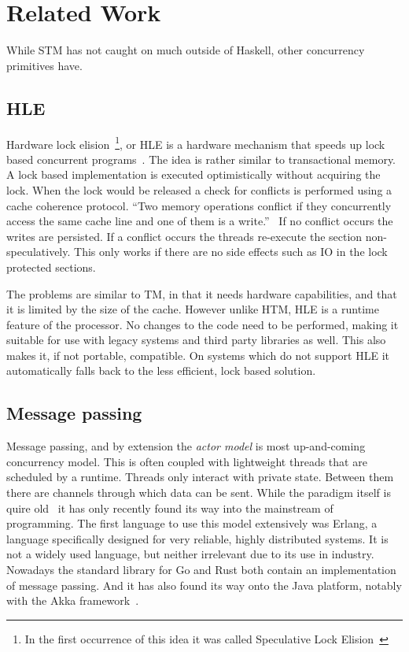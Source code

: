 \section{Related Work}

\label{sec:related-work}

While STM has not caught on much outside of Haskell, other concurrency
primitives have.

\subsection{HLE}

Hardware lock elision~\footnote{In the first occurrence of this idea it was
  called Speculative Lock Elision~\cite{sle}}, or HLE is a hardware mechanism
that speeds up lock based concurrent programs~\cite{sle,hle}. The idea is rather
similar to transactional memory. A lock based implementation is executed
optimistically without acquiring the lock. When the lock would be released a
check for conflicts is performed using a cache coherence protocol. ``Two memory
operations conflict if they concurrently access the same cache line and one of
them is a write.''~\cite{hle} If no conflict occurs the writes are persisted. If
a conflict occurs the threads re-execute the section non-speculatively. This
only works if there are no side effects such as IO in the lock protected
sections.

The problems are similar to TM, in that it needs hardware capabilities, and that
it is limited by the size of the cache. However unlike HTM, HLE is a runtime
feature of the processor. No changes to the code need to be performed, making it
suitable for use with legacy systems and third party libraries as well. This
also makes it, if not portable, compatible. On systems which do not support HLE
it automatically falls back to the less efficient, lock based solution.

\subsection{Message passing}

Message passing, and by extension the \emph{actor model} is most up-and-coming
concurrency model. This is often coupled with lightweight threads that are
scheduled by a runtime. Threads only interact with private state. Between them
there are channels through which data can be sent. While the paradigm itself is
quire old~\cite{mpi-paradigm,actors} it has only recently found its way into the
mainstream of programming. The first language to use this model extensively was
Erlang, a language specifically designed for very reliable, highly distributed
systems. It is not a widely used language, but neither irrelevant due to its use
in industry. Nowadays the standard library for Go and Rust both contain an
implementation of message passing. And it has also found its way onto the Java
platform, notably with the Akka framework~\cite{akka}.

